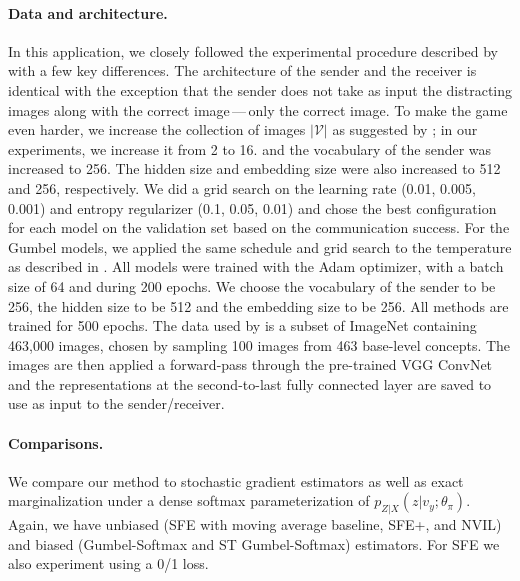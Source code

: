 \paragraph*{Data and architecture.} In this application, we closely
followed the experimental procedure described
by~\citet{Lazaridou2017} with a few key differences. The architecture
of the sender and the receiver is identical with the exception that
the sender does not take as input the distracting images along with
the correct image\,---\,only the correct image. To make the game even
harder, we increase the collection of images $|\mathcal{V}|$ as
suggested by \citet{Havrylov2017}; in our experiments, we increase it
from 2 to 16. and the vocabulary of the sender was increased to 256.
The hidden size and embedding size were also increased to 512 and 256,
respectively. We did a grid search on the learning rate (0.01, 0.005,
0.001) and entropy regularizer (0.1, 0.05, 0.01) and chose the best
configuration for each model on the validation set based on the
communication success. For the Gumbel models, we applied the same
schedule and grid search to the temperature as described in
. All models were trained with the Adam optimizer,
with a batch size of 64 and during 200 epochs. We choose the
vocabulary of the sender to be 256, the hidden size to be 512 and the
embedding size to be 256. All methods are trained for 500 epochs. The
data used by \citet{Lazaridou2017} is a subset of ImageNet containing
463,000 images, chosen by sampling 100 images from 463 base-level
concepts. The images are then applied a forward-pass through the
pre-trained VGG ConvNet~\citep{convnet} and the representations at the
second-to-last fully connected layer are saved to use as input to the
sender/receiver.

\paragraph*{Comparisons.} We compare our method to stochastic gradient
estimators as well as exact marginalization under a dense softmax
parameterization of $p_{Z|X}(z |v_y; \theta_\pi)$. Again, we have
unbiased (SFE with moving average baseline, SFE+, and NVIL) and
biased (Gumbel-Softmax and ST Gumbel-Softmax) estimators. For SFE we
also experiment using a 0/1 loss.

